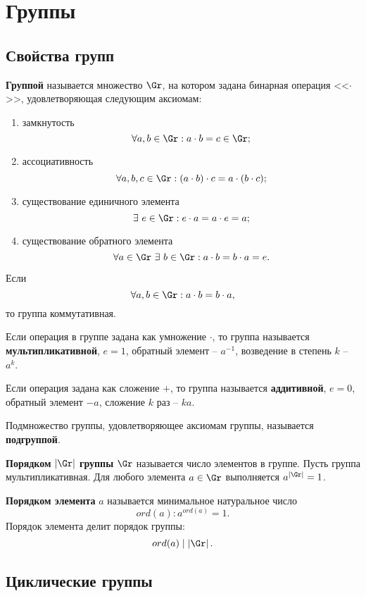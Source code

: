 \section{Группы}\label{section-groups}

\subsection{Свойства групп}

\textbf{Группой} называется множество $\Gr$, на котором задана бинарная операция <<$\cdot$>>, удовлетворяющая следующим аксиомам:
\begin{enumerate}
    \item замкнутость
        \[ \forall a,b \in \Gr: a \cdot b = c \in \Gr; \]
    \item ассоциативность
        \[ \forall a,b,c \in \Gr: (a \cdot b) \cdot c = a \cdot (b \cdot c); \]
    \item существование единичного элемента
        \[ \exists ~ e \in \Gr: e\cdot a = a \cdot e = a; \]
    \item существование обратного элемента
        \[ \forall a \in \Gr ~ \exists ~ b \in \Gr: a \cdot b = b \cdot a = e. \]
\end{enumerate}
Если
    \[ \forall a,b \in \Gr: a \cdot b = b \cdot a, \]
то группа коммутативная.

Если операция в группе задана как умножение $\cdot$, то группа называется \textbf{мультипликативной}, $e = 1$, обратный элемент -- $a^{-1}$, возведение в степень $k$ -- $a^k$.

Если операция задана как сложение $+$, то группа называется \textbf{аддитивной}, $e = 0$, обратный элемент $-a$, сложение $k$ раз -- $ka$.

Подмножество группы, удовлетворяющее аксиомам группы, называется \textbf{подгруппой}.

\textbf{Порядком} $|\Gr|$ \textbf{группы} $\Gr$ называется число элементов в группе. Пусть группа мультипликативная. Для любого элемента $a \in \Gr$ выполняется $a^{|\Gr|} = 1$.

\textbf{Порядком элемента} $a$ называется минимальное натуральное число
    \[ ord(a): a^{ord(a)} = 1. \]
 Порядок элемента делит порядок группы:
    \[ ord(a) \mid \left|\Gr\right|. \]


\subsection{Циклические группы}

